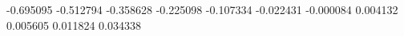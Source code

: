 -0.695095
-0.512794
-0.358628
-0.225098
-0.107334
-0.022431
-0.000084
0.004132
0.005605
0.011824
0.034338
